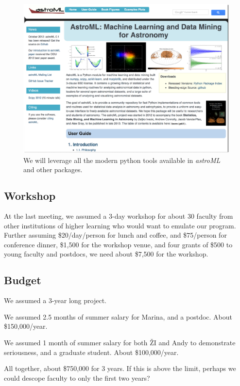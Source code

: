 \begin{figure}[!t]
\vskip -5.5in
\includegraphics[width=1.02\hsize,clip]{astroML.eps}
\vskip -2.0in
\caption{We will leverage all the modern python tools available in {\it astroML} and
other packages.} 
\label{Fig:astroML}
\end{figure}




\subsection{Workshop} 


At the last meeting, we assumed a 3-day workshop for about 30 faculty from other institutions
of higher learning who would want to emulate our program. Further assuming \$20/day/person
for lunch and coffee, and \$75/person for conference dinner, \$1,500 for the workshop venue,
and four grants of \$500 to young faculty and postdocs, we need about \$7,500 for the workshop. 



\subsection{Budget} 

We assumed a 3-year long project. 

We assumed 2.5 months of summer salary for Marina, and a postdoc. About \$150,000/year. 

We assumed 1 month of summer salary for both \v{Z}I and Andy to demonstrate seriousness,
and a graduate student. About \$100,000/year. 

All together, about \$750,000 for 3 years. If this is above the limit, perhaps we could 
descope faculty to only the first two years? 



